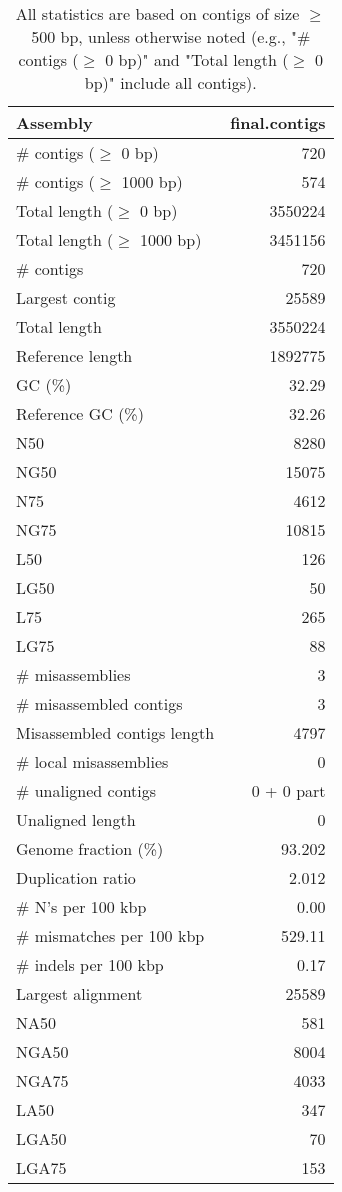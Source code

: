 \documentclass[12pt,a4paper]{article}
\begin{document}
\begin{table}[ht]
\begin{center}
\caption{All statistics are based on contigs of size $\geq$ 500 bp, unless otherwise noted (e.g., "\# contigs ($\geq$ 0 bp)" and "Total length ($\geq$ 0 bp)" include all contigs).}
\begin{tabular}{|l*{1}{|r}|}
\hline
Assembly & final.contigs \\ \hline
\# contigs ($\geq$ 0 bp) & 720 \\ \hline
\# contigs ($\geq$ 1000 bp) & 574 \\ \hline
Total length ($\geq$ 0 bp) & 3550224 \\ \hline
Total length ($\geq$ 1000 bp) & 3451156 \\ \hline
\# contigs & 720 \\ \hline
Largest contig & 25589 \\ \hline
Total length & 3550224 \\ \hline
Reference length & 1892775 \\ \hline
GC (\%) & 32.29 \\ \hline
Reference GC (\%) & 32.26 \\ \hline
N50 & 8280 \\ \hline
NG50 & 15075 \\ \hline
N75 & 4612 \\ \hline
NG75 & 10815 \\ \hline
L50 & 126 \\ \hline
LG50 & 50 \\ \hline
L75 & 265 \\ \hline
LG75 & 88 \\ \hline
\# misassemblies & 3 \\ \hline
\# misassembled contigs & 3 \\ \hline
Misassembled contigs length & 4797 \\ \hline
\# local misassemblies & 0 \\ \hline
\# unaligned contigs & 0 + 0 part \\ \hline
Unaligned length & 0 \\ \hline
Genome fraction (\%) & 93.202 \\ \hline
Duplication ratio & 2.012 \\ \hline
\# N's per 100 kbp & 0.00 \\ \hline
\# mismatches per 100 kbp & 529.11 \\ \hline
\# indels per 100 kbp & 0.17 \\ \hline
Largest alignment & 25589 \\ \hline
NA50 & 581 \\ \hline
NGA50 & 8004 \\ \hline
NGA75 & 4033 \\ \hline
LA50 & 347 \\ \hline
LGA50 & 70 \\ \hline
LGA75 & 153 \\ \hline
\end{tabular}
\end{center}
\end{table}
\end{document}
